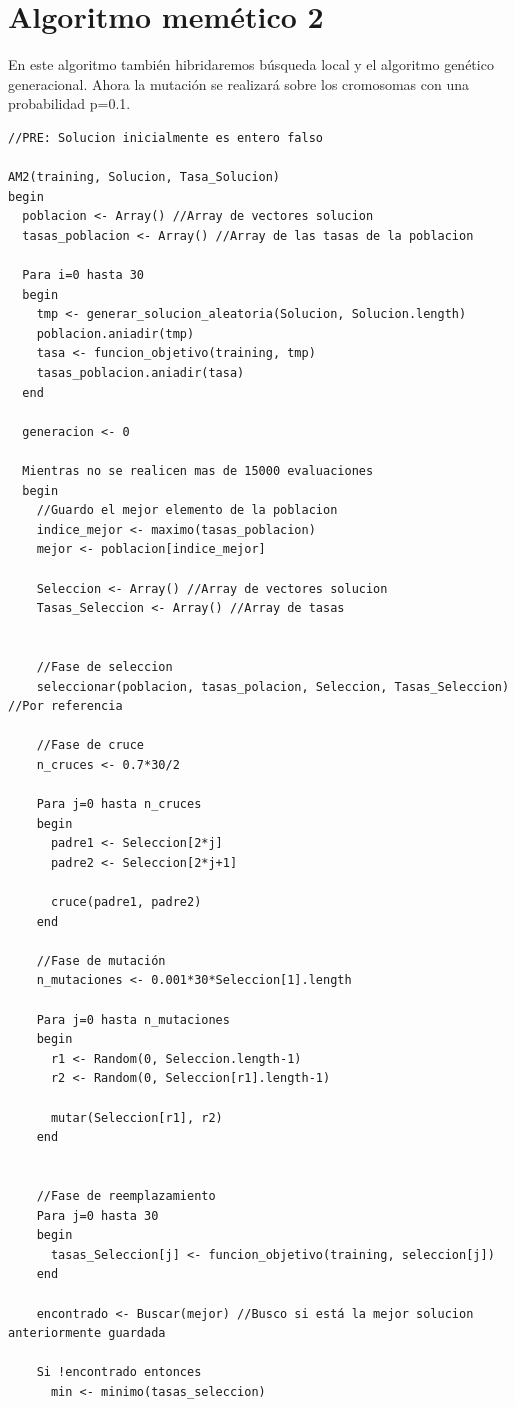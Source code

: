 \section{Algoritmo memético 2}
En este algoritmo también hibridaremos búsqueda local y el algoritmo genético generacional. Ahora la mutación se realizará sobre los cromosomas con una probabilidad p=0.1.
\begin{lstlisting}
//PRE: Solucion inicialmente es entero falso

AM2(training, Solucion, Tasa_Solucion)
begin
  poblacion <- Array() //Array de vectores solucion
  tasas_poblacion <- Array() //Array de las tasas de la poblacion

  Para i=0 hasta 30
  begin
    tmp <- generar_solucion_aleatoria(Solucion, Solucion.length)
    poblacion.aniadir(tmp)
    tasa <- funcion_objetivo(training, tmp)
    tasas_poblacion.aniadir(tasa)
  end

  generacion <- 0

  Mientras no se realicen mas de 15000 evaluaciones
  begin
    //Guardo el mejor elemento de la poblacion
    indice_mejor <- maximo(tasas_poblacion)
    mejor <- poblacion[indice_mejor]

    Seleccion <- Array() //Array de vectores solucion
    Tasas_Seleccion <- Array() //Array de tasas


    //Fase de seleccion
    seleccionar(poblacion, tasas_polacion, Seleccion, Tasas_Seleccion) //Por referencia

    //Fase de cruce
    n_cruces <- 0.7*30/2

    Para j=0 hasta n_cruces
    begin
      padre1 <- Seleccion[2*j]
      padre2 <- Seleccion[2*j+1]

      cruce(padre1, padre2)
    end

    //Fase de mutación
    n_mutaciones <- 0.001*30*Seleccion[1].length

    Para j=0 hasta n_mutaciones
    begin
      r1 <- Random(0, Seleccion.length-1)
      r2 <- Random(0, Seleccion[r1].length-1)

      mutar(Seleccion[r1], r2)
    end


    //Fase de reemplazamiento
    Para j=0 hasta 30
    begin
      tasas_Seleccion[j] <- funcion_objetivo(training, seleccion[j])
    end

    encontrado <- Buscar(mejor) //Busco si está la mejor solucion anteriormente guardada

    Si !encontrado entonces
      min <- minimo(tasas_seleccion)


\end{lstlisting}
